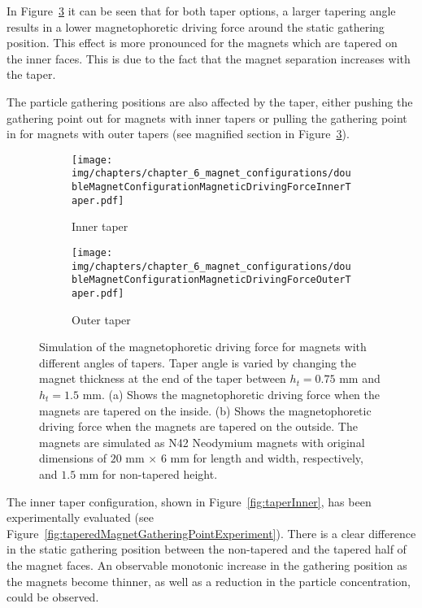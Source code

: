 In Figure~\ref{fig:taperedMagnetDrivingForce} it can be seen that for both taper options, a larger tapering angle results in a lower magnetophoretic driving force around the static gathering position. This effect is more pronounced for the magnets which are tapered on the inner faces. This is due to the fact that the magnet separation increases with the taper. 

The particle gathering positions are also affected by the taper, either pushing the gathering point out for magnets with inner tapers or pulling the gathering point in for magnets with outer tapers (see magnified section in Figure~\ref{fig:taperedMagnetDrivingForce}).

\begin{figure}[htb!]
\centering
	\begin{subfigure}[b]{\textwidth}
		\centering
		\texttt{[image: img/chapters/chapter\_6\_magnet\_configurations/doubleMagnetConfigurationMagneticDrivingForceInnerTaper.pdf]}
	\caption{Inner taper}
    \label{fig:innterTaperDrivingForce}
    \end{subfigure}
    \begin{subfigure}[b]{\textwidth}
    	\centering
		\texttt{[image: img/chapters/chapter\_6\_magnet\_configurations/doubleMagnetConfigurationMagneticDrivingForceOuterTaper.pdf]}
	\caption{Outer taper}
    \label{fig:outerTaperDrivingForce}
	\end{subfigure}
\caption[Simulation of the magnetophoretic driving force for different magnet tapers]{Simulation of the magnetophoretic driving force for magnets with different angles of tapers. Taper angle is varied by changing the magnet thickness at the end of the taper between $h_{t}=0.75$ mm and $h_{t}=1.5$ mm. (a) Shows the magnetophoretic driving force when the magnets are tapered on the inside. (b) Shows the magnetophoretic driving force when the magnets are tapered on the outside. The magnets are simulated as N42 Neodymium magnets with original dimensions of $20$ mm $\times$ $6$ mm for length and width, respectively, and $1.5$ mm for non-tapered height.}
\label{fig:taperedMagnetDrivingForce}
\end{figure}

The inner taper configuration, shown in Figure~\ref{fig:taperInner}, has been experimentally evaluated (see Figure~\ref{fig:taperedMagnetGatheringPointExperiment}). There is a clear difference in the static gathering position between the non-tapered and the tapered half of the magnet faces. An observable monotonic increase in the gathering position as the magnets become thinner, as well as a reduction in the particle concentration, could be observed.

